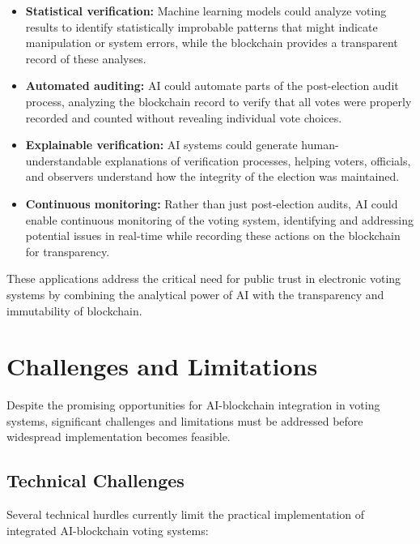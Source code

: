 \documentclass[conference]{IEEEtran}
\begin{document}
\begin{itemize}
    \item \textbf{Statistical verification:} Machine learning models could analyze voting results to identify statistically improbable patterns that might indicate manipulation or system errors, while the blockchain provides a transparent record of these analyses.
    
    \item \textbf{Automated auditing:} AI could automate parts of the post-election audit process, analyzing the blockchain record to verify that all votes were properly recorded and counted without revealing individual vote choices.
    
    \item \textbf{Explainable verification:} AI systems could generate human-understandable explanations of verification processes, helping voters, officials, and observers understand how the integrity of the election was maintained.
    
    \item \textbf{Continuous monitoring:} Rather than just post-election audits, AI could enable continuous monitoring of the voting system, identifying and addressing potential issues in real-time while recording these actions on the blockchain for transparency.
\end{itemize}

These applications address the critical need for public trust in electronic voting systems by combining the analytical power of AI with the transparency and immutability of blockchain.

\section{Challenges and Limitations}
Despite the promising opportunities for AI-blockchain integration in voting systems, significant challenges and limitations must be addressed before widespread implementation becomes feasible.

\subsection{Technical Challenges}
Several technical hurdles currently limit the practical implementation of integrated AI-blockchain voting systems:
\end{document}
